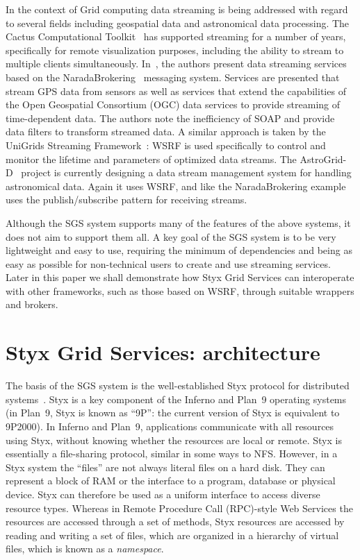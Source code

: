 \documentclass[a4paper]{article}
\begin{document}
In the context of Grid computing data streaming is being addressed with regard to several fields including geospatial data and astronomical data processing. The Cactus Computational Toolkit~\cite{allen:2001} has supported streaming for a number of years, specifically for remote visualization purposes, including the ability to stream to multiple clients simultaneously. In~\cite{fox:2006}, the authors present data streaming services based on the NaradaBrokering~\cite{naradabrokering} messaging system. Services are presented that stream GPS data from sensors as well as services that extend the capabilities of the Open Geospatial Consortium (OGC) data services to provide streaming of time-dependent data. The authors note the inefficiency of SOAP and provide data filters to transform streamed data. A similar approach is taken by the UniGrids Streaming Framework~\cite{benedyczak:2006}: WSRF is used specifically to control and monitor the lifetime and parameters of optimized data streams. The AstroGrid-D~\cite{astrogrid-d} project is currently designing a data stream management system for handling astronomical data. Again it uses WSRF, and like the NaradaBrokering example uses the publish/subscribe pattern for receiving streams.

Although the SGS system supports many of the features of the above systems, it does not aim to support them all.  A key goal of the SGS system is to be very lightweight and easy to use, requiring the minimum of dependencies and being as easy as possible for non-technical users to create and use streaming services.  Later in this paper we shall demonstrate how Styx Grid Services can interoperate with other frameworks, such as those based on WSRF, through suitable wrappers and brokers.

\section{Styx Grid Services: architecture}\label{sec:architecture}

The basis of the SGS system is the well-established Styx protocol for distributed systems~\cite{Pike:1999}.  Styx is a key component of the Inferno \cite{Inferno} and Plan~9 \cite{Plan9} operating systems (in Plan~9, Styx is known as ``9P'': the current version of Styx is equivalent to 9P2000).  In Inferno and Plan~9, applications communicate with all resources using Styx, without knowing whether the resources are local or remote.  Styx is essentially a file-sharing protocol, similar in some ways to NFS.  However, in a Styx system the ``files'' are not always literal files on a hard disk.  They can represent a block of RAM or the interface to a program, database or physical device.  Styx can therefore be used as a uniform interface to access diverse resource types.  Whereas in Remote Procedure Call (RPC)-style Web Services the resources are accessed through a set of methods, Styx resources are accessed by reading and writing a set of files, which are organized in a hierarchy of virtual files, which is known as a \textit{namespace\/}.
\end{document}
